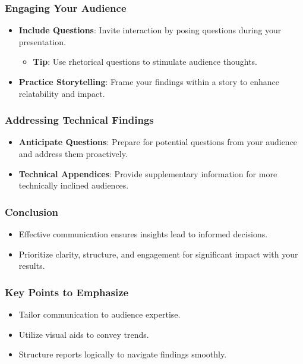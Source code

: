 \documentclass[aspectratio=169]{beamer}
\begin{document}
\begin{frame}[fragile]
    \frametitle{Engaging Your Audience}
    \begin{itemize}
        \item \textbf{Include Questions}: Invite interaction by posing questions during your presentation.
            \begin{itemize}
                \item \textbf{Tip}: Use rhetorical questions to stimulate audience thoughts.
            \end{itemize}
        \item \textbf{Practice Storytelling}: Frame your findings within a story to enhance relatability and impact.
    \end{itemize}
\end{frame}

\begin{frame}[fragile]
    \frametitle{Addressing Technical Findings}
    \begin{itemize}
        \item \textbf{Anticipate Questions}: Prepare for potential questions from your audience and address them proactively.
        \item \textbf{Technical Appendices}: Provide supplementary information for more technically inclined audiences.
    \end{itemize}
\end{frame}

\begin{frame}[fragile]
    \frametitle{Conclusion}
    \begin{itemize}
        \item Effective communication ensures insights lead to informed decisions.
        \item Prioritize clarity, structure, and engagement for significant impact with your results.
    \end{itemize}
\end{frame}

\begin{frame}[fragile]
    \frametitle{Key Points to Emphasize}
    \begin{itemize}
        \item Tailor communication to audience expertise.
        \item Utilize visual aids to convey trends.
        \item Structure reports logically to navigate findings smoothly.
    \end{itemize}
\end{frame}
\end{document}
